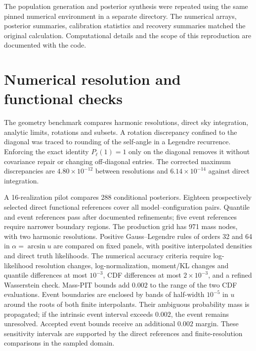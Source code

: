 \documentclass[11pt,a4paper]{article}
\begin{document}
The population generation and posterior synthesis were repeated using the same pinned numerical environment in a separate directory. The numerical arrays, posterior summaries, calibration statistics and recovery summaries matched the original calculation. Computational details and the scope of this reproduction are documented with the code.

\appendix
\section{Numerical resolution and functional checks}\label{app:numerics}
The geometry benchmark compares harmonic resolutions, direct sky integration, analytic limits, rotations and subsets. A rotation discrepancy confined to the diagonal was traced to rounding of the self-angle in a Legendre recurrence. Enforcing the exact identity $P_\ell(1)=1$ only on the diagonal removes it without covariance repair or changing off-diagonal entries. The corrected maximum discrepancies are $4.80\times10^{-12}$ between resolutions and $6.14\times10^{-14}$ against direct integration.

A 16-realization pilot compares 288 conditional posteriors. Eighteen prospectively selected direct functional references cover all model--configuration pairs. Quantile and event references pass after documented refinements; five event references require narrower boundary regions. The production grid has 971 mass nodes, with two harmonic resolutions. Positive Gauss--Legendre rules of orders 32 and 64 in $\alpha=\arcsin u$ are compared on fixed panels, with positive interpolated densities and direct truth likelihoods. The numerical accuracy criteria require log-likelihood resolution changes, log-normalization, moment/KL changes and quantile differences at most $10^{-3}$, CDF differences at most $2\times10^{-3}$, and a refined Wasserstein check. Mass-PIT bounds add $0.002$ to the range of the two CDF evaluations. Event boundaries are enclosed by bands of half-width $10^{-5}$ in $u$ around the roots of both finite interpolants. Their ambiguous probability mass is propagated; if the intrinsic event interval exceeds $0.002$, the event remains unresolved. Accepted event bounds receive an additional $0.002$ margin. These sensitivity intervals are supported by the direct references and finite-resolution comparisons in the sampled domain.


\printbibliography
\end{document}
